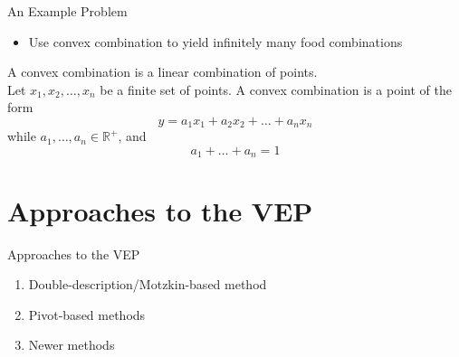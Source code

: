 \documentclass[10pt]{beamer}
\begin{document}
\begin{frame}{An Example Problem}
	\begin{itemize}
		\item Use convex combination to yield infinitely many food combinations
	\end{itemize}
	\pause 
	\begin{definition}
		A convex combination is a linear combination of points. \\
		
		Let $x_1, x_2, \dots, x_n$ be a finite set of points. A convex combination is a point of the form 
		\begin{equation*}
		y = a_1x_1 + a_2x_2 + \dots + a_nx_n
		\end{equation*}
		while $a_1, \dots, a_n\in\mathbb{R^+}$, and
		\begin{equation*}
		a_1 + \dots + a_n = 1
		\end{equation*}
	\end{definition}
\end{frame}

\section{Approaches to the VEP}
\begin{frame}{Approaches to the VEP}
	\begin{enumerate}
		\item Double-description/Motzkin-based method
		\item Pivot-based methods
		\item Newer methods
	\end{enumerate}
\end{frame}
\end{document}
